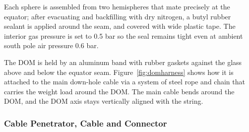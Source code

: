 Each sphere is assembled from two hemispheres that
mate precisely at the equator; after evacuating and backfilling with dry nitrogen, a butyl rubber
sealant is applied around the seam, and covered with wide plastic tape.
The interior gas pressure is set to 0.5 bar so the seal remains tight even
at ambient south pole air pressure 0.6 bar.

The DOM is held by an aluminum band with rubber gaskets against
the glass above and below the equator seam. 
Figure~\ref{fig:domharness} shows how it is attached to the main down-hole cable via a system
of steel rope and chain that carries the weight load around the DOM.
The main cable bends around the DOM, and the DOM axis stays vertically aligned with the string.



\subsubsection{\label{sec:penetrator}Cable Penetrator, Cable and Connector}

